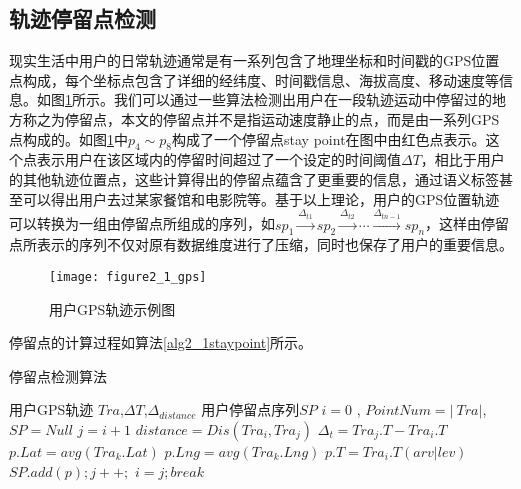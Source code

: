 \subsection{轨迹停留点检测}
现实生活中用户的日常轨迹通常是有一系列包含了地理坐标和时间戳的GPS位置点构成，每个坐标点包含了详细的经纬度、时间戳信息、海拔高度、移动速度等信息。如图\ref{fig:2_1}所示。我们可以通过一些算法检测出用户在一段轨迹运动中停留过的地方称之为停留点，本文的停留点并不是指运动速度静止的点，而是由一系列GPS点构成的。如图\ref{fig:2_1}中$p_{4} \sim p_{8}$构成了一个停留点stay point在图中由红色点表示。这个点表示用户在该区域内的停留时间超过了一个设定的时间阈值$\Delta T$，相比于用户的其他轨迹位置点，这些计算得出的停留点蕴含了更重要的信息，通过语义标签甚至可以得出用户去过某家餐馆和电影院等。基于以上理论，用户的GPS位置轨迹可以转换为一组由停留点所组成的序列，如$sp_{1}\overset{\Delta_{t1}}{\rightarrow} sp_{2}\overset{\Delta_{t2}}{\rightarrow}\cdots \overset{\Delta_{tn-1}}{\rightarrow}sp_{n}$，这样由停留点所表示的序列不仅对原有数据维度进行了压缩，同时也保存了用户的重要信息。
\begin{figure}[H]
\centering
\texttt{[image: figure2\_1\_gps]}
\caption{用户GPS轨迹示例图}
\label{fig:2_1}
\end{figure}
\par 停留点的计算过程如算法\ref{alg2_1staypoint}所示。
\begin{algorithm}[htb]
\caption{停留点检测算法}
\label{alg2_1staypoint}
\begin{algorithmic}[1] %
				\REQUIRE 用户GPS轨迹 $Tra$,$\Delta T$,$\Delta_{distance}$
				\ENSURE 用户停留点序列$SP$
				\STATE $i = 0$ , $PointNum= \left| \ Tra \right|$,$SP = Null$
				\STATE $j = i+1$
				\STATE $distance=Dis(Tra_{i},Tra_{j})$
				\STATE $\Delta_{t}=Tra_{j}.T-Tra_{i}.T$
				\STATE $p.Lat = avg(Tra_{k}.Lat)  $
				\STATE $p.Lng = avg(Tra_{k}.Lng)$
				\STATE $p.T = Tra_{i}.T(arv|lev)$%
				\STATE $SP .add(p) ;j++; $
				\ENDIF				
				\ENDIF				
				\ENDWHILE
				\STATE $i=j ; break$
				\ENDWHILE
				\STATE {}
\end{algorithmic}
\end{algorithm}
